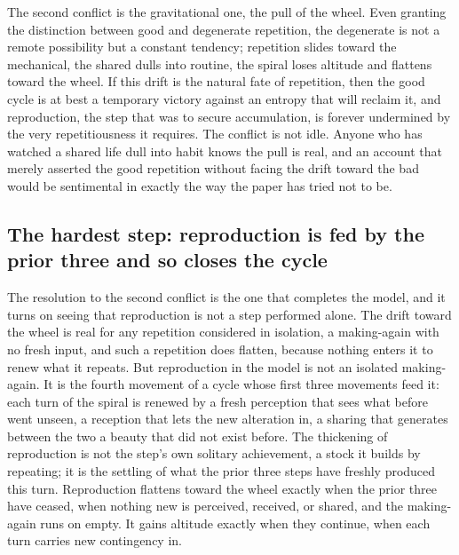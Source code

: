 The second conflict is the gravitational one, the pull of the wheel. Even granting the distinction between good and degenerate repetition, the degenerate is not a remote possibility but a constant tendency; repetition slides toward the mechanical, the shared dulls into routine, the spiral loses altitude and flattens toward the wheel. If this drift is the natural fate of repetition, then the good cycle is at best a temporary victory against an entropy that will reclaim it, and reproduction, the step that was to secure accumulation, is forever undermined by the very repetitiousness it requires. The conflict is not idle. Anyone who has watched a shared life dull into habit knows the pull is real, and an account that merely asserted the good repetition without facing the drift toward the bad would be sentimental in exactly the way the paper has tried not to be.

\subsection{The hardest step: reproduction is fed by the prior three and so closes the cycle}
\label{p22:sub:reproduction-hardest}

The resolution to the second conflict is the one that completes the model, and it turns on seeing that reproduction is not a step performed alone. The drift toward the wheel is real for any repetition considered in isolation, a making-again with no fresh input, and such a repetition does flatten, because nothing enters it to renew what it repeats. But reproduction in the model is not an isolated making-again. It is the fourth movement of a cycle whose first three movements feed it: each turn of the spiral is renewed by a fresh perception that sees what before went unseen, a reception that lets the new alteration in, a sharing that generates between the two a beauty that did not exist before. The thickening of reproduction is not the step's own solitary achievement, a stock it builds by repeating; it is the settling of what the prior three steps have freshly produced this turn. Reproduction flattens toward the wheel exactly when the prior three have ceased, when nothing new is perceived, received, or shared, and the making-again runs on empty. It gains altitude exactly when they continue, when each turn carries new contingency in.


